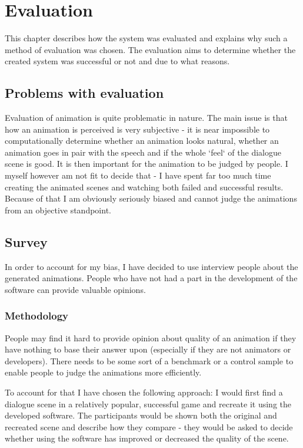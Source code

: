 \chapter{Evaluation \label{chap:eval}}
This chapter describes how the system was evaluated and explains why such a method of evaluation was chosen. The evaluation aims to determine whether the created system was successful or not and due to what reasons. 

\section{Problems with evaluation}
Evaluation of animation is quite problematic in nature. The main issue is that how an animation is perceived is very subjective - it is near impossible to computationally determine whether an animation looks natural, whether an animation goes in pair with the speech and if the whole `feel` of the dialogue scene is good. It is then important for the animation to be judged by people. I myself however am not fit to decide that - I have spent far too much time creating the animated scenes and watching both failed and successful results. Because of that I am obviously seriously biased and cannot judge the animations from an objective standpoint.


\section{Survey}
In order to account for my bias, I have decided to use interview people about the generated animations. People who have not had a part in the development of the software can provide valuable opinions.


\subsection{Methodology}
People may find it hard to provide opinion about quality of an animation if they have nothing to base their answer upon (especially if they are not animators or developers). There needs to be some sort of a benchmark or a control sample to enable people to judge the animations more efficiently.

To account for that I have chosen the following approach: I would first find a dialogue scene in a relatively popular, successful game and recreate it using the developed software. The participants would be shown both the original and recreated scene and describe how they compare - they would be asked to decide whether using the software has improved or decreased the quality of the scene. 

